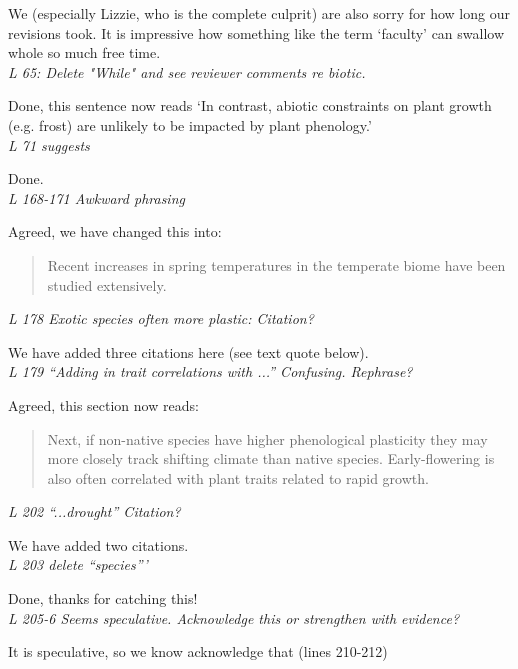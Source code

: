 \documentclass[11pt,a4paper]{letter}
\begin{document}
\begin{letter}{}
We (especially Lizzie, who is the complete culprit) are also sorry for how long our revisions took. It is impressive how something like the term `faculty' can swallow whole so much free time.\\

\emph{L 65: Delete "While" and see reviewer comments re biotic.}

Done, this sentence now reads `In contrast, abiotic constraints on plant growth (e.g. frost) are unlikely to be impacted by plant phenology.'\\

\emph{L 71 suggests}

Done.\\

\emph{L 168-171 Awkward phrasing}

Agreed, we have changed this into:

\begin{quote}
Recent increases in spring temperatures in the temperate biome \citep[at least partially associated with increases in greenhouse gases, see][]{Trenberth:2007hk} have been studied extensively.
\end{quote}

\emph{L 178 Exotic species often more plastic: Citation?}

We have added three citations here (see text quote below).\\

\emph{L 179 ``Adding in trait correlations with ...'' Confusing. Rephrase?} 

Agreed, this section now reads:
\begin{quote}
Next, if non-native species have higher phenological plasticity \citep[e.g.,][]{wainwright2013} they may more closely track shifting climate than native species. Early-flowering is also often correlated with plant traits related to rapid growth. 
\end{quote}

\emph{L 202 ``...drought'' Citation?}

We have added two citations.\\

\emph{L 203 delete ``species'''}

Done, thanks for catching this!\\

\emph{L 205-6 Seems speculative. Acknowledge this or strengthen with evidence?}

It is speculative, so we know acknowledge that (lines 210-212)\\


\end{letter}
\end{document}
